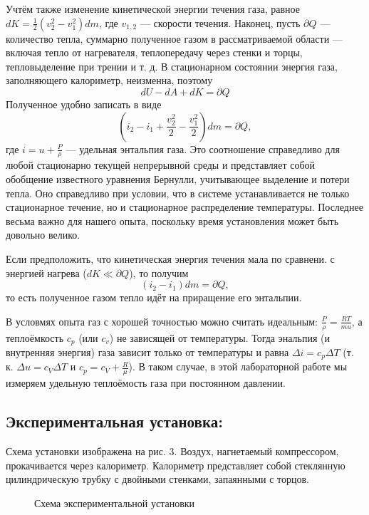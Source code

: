 \documentclass[a4paper,12pt]{article}
\begin{document}
	Учтём также изменение кинетической энергии течения газа, равное $dK = \frac{1}{2}(v_2^2 - v_1^2)dm$, где $v_{1, 2}$ --- скорости течения. Наконец, пусть $\partial Q$ --- количество тепла, суммарно полученное газом в рассматриваемой области --- включая тепло от нагревателя, теплопередачу через стенки и торцы, тепловыделение при трении и т. д. В стационарном состоянии энергия газа, заполняющего калориметр, неизменна, поэтому
	\[
	dU - dA + dK = \partial Q
	\]
	Полученное удобно записать в виде
	\[
	(i_2 - i_1 + \frac{v_2^2}{2} - \frac{v_1^2}{2}) dm = \partial Q,
	\]
	где $i = u + \frac{P}{\rho}$ --- удельная энтальпия газа.
	Это соотношение справедливо для любой стационарно текущей непрерывной среды и представляет собой обобщение известного уравнения Бернулли, учитывающее выделение и потери тепла. Оно справедливо при условии, что в системе устанавливается не только стационарное течение, но и стационарное распределение температуры. Последнее весьма важно для нашего опыта, поскольку время установления может быть довольно велико.
	
	Если предположить, что кинетическая энергия течения мала по сравнени. с энергией нагрева ($dK \ll \partial Q$), то получим 
	\[
	(i_2 - i_1) dm = \partial Q,
	\]
	то есть полученное газом тепло идёт на приращение его энтальпии.
	
	В условмях опыта газ с хорошей точностью можно считать идеальным: $\frac{P}{\rho} = \frac{RT} {mu}$, а теплоёмкость $c_p$ (или $c_v$) не зависящей от температуры. Тогда энальпия (и внутренняя энергия) газа зависит только от температуры и равна $\Delta i = c_p \Delta T$ (т. к. $\Delta u = c_V \Delta T$ и $c_p = c_V + \frac{R}{\mu}$). В таком случае, в этой лабораторной работе мы измеряем удельную теплоёмость газа при постоянном давлении.
	
	
	
	\subsection{Экспериментальная установка:}

 
	Схема установки изображена на рис. 3. Воздух, нагнетаемый компрессором, прокачивается через калориметр. Калориметр представляет собой стеклянную цилиндрическую трубку с двойными стенками, запаянными с торцов.
	
	\begin{figure}[h!]
		\caption[]{\label{fig:3} Схема экспериментальной установки}
	\end{figure}
	
\end{document}
